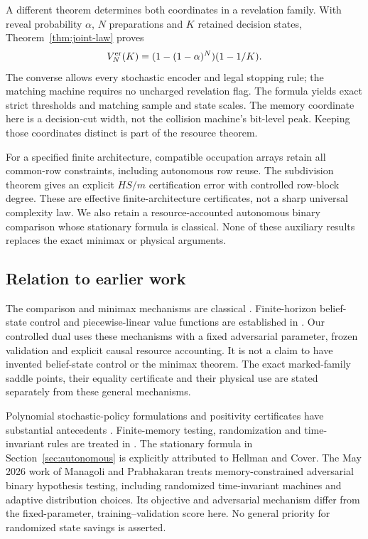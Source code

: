 A different theorem determines both coordinates in a revelation family.
With reveal probability $\alpha$, $N$ preparations and $K$ retained
decision states, Theorem~\ref{thm:joint-law} proves
\[
       V_N^{\rm er}(K)=(1-(1-\alpha)^N)(1-1/K).
\]
The converse allows every stochastic encoder and legal stopping rule;
the matching machine requires no uncharged revelation flag. The formula
yields exact strict thresholds and matching sample and state scales.
The memory coordinate here is a decision-cut width, not the collision
machine's bit-level peak. Keeping those coordinates distinct is part
of the resource theorem.

For a specified finite architecture, compatible occupation arrays retain
all common-row constraints, including autonomous row reuse. The
subdivision theorem gives an explicit $HS/m$ certification error with
controlled row-block degree. These are effective finite-architecture
certificates, not a sharp universal complexity law. We also retain a
resource-accounted autonomous binary comparison whose stationary formula
is classical. None of these auxiliary results replaces the exact
minimax or physical arguments.

\subsection{Relation to earlier work}
The comparison and minimax mechanisms are classical
\cite{Blackwell,Sion}. Finite-horizon belief-state control and
piecewise-linear value functions are established in
\cite{SmallwoodSondik}. Our controlled dual uses these mechanisms with a
fixed adversarial parameter, frozen validation and explicit causal
resource accounting. It is not a claim to have invented belief-state
control or the minimax theorem. The exact marked-family saddle points,
their equality certificate and their physical use are stated separately
from these general mechanisms.

Polynomial stochastic-policy formulations and positivity certificates
have substantial antecedents \cite{MM,Putinar}. Finite-memory testing,
randomization and time-invariant rules are treated in
\cite{HC,HCrandom,FH,CFH}. The stationary formula in
Section~\ref{sec:autonomous} is explicitly attributed to Hellman and
Cover. The May 2026 work of Managoli and Prabhakaran \cite{MP} treats
memory-constrained adversarial binary hypothesis testing, including
randomized time-invariant machines and adaptive distribution choices.
Its objective and adversarial mechanism differ from the fixed-parameter,
training--validation score here. No general priority for randomized
state savings is asserted.

